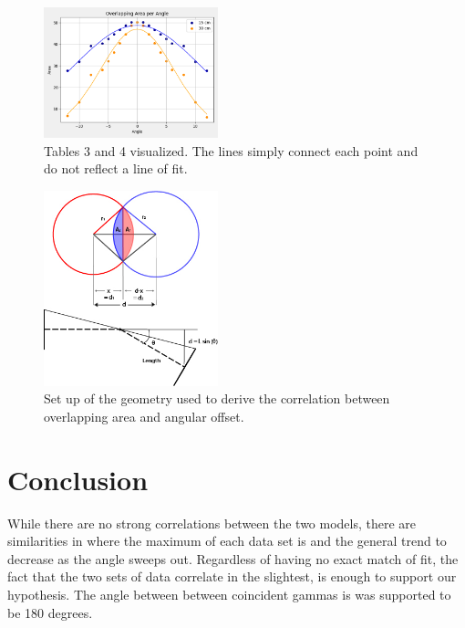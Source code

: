 \documentclass[12pt, letterpaper, twocolumn]{article}
\begin{document}
\begin{figure}[H]
    \centering
    \includegraphics[width=0.45\textwidth]{Figures/overlapping_area_gauss_fit.png}
    \caption{Tables 3 and 4 visualized. The lines simply connect each point and
    do not reflect a line of fit.}
    \label{figure:model2_graph}
\end{figure}
\begin{figure}[H]
    \centering
    \includegraphics[width=0.45\textwidth]{Figures/geometry.jpg}
    \caption{Set up of the geometry used to derive the correlation between
    overlapping area and angular offset.}
    \label{figure:geometry}
\end{figure}
\section{Conclusion}
While there are no strong correlations between the two models, there are
similarities in where the maximum of each data set is and the general trend to
decrease as the angle sweeps out. Regardless of having no exact match of fit,
the fact that the two sets of data correlate in the slightest, is enough to
support our hypothesis. The angle between between coincident gammas is was
supported to be 180 degrees.
\end{document}
